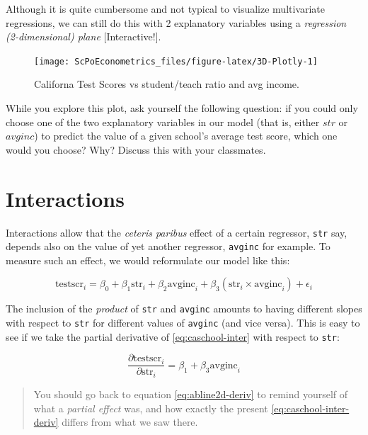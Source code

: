 \documentclass[]{book}
\theoremstyle{definition}
\theoremstyle{definition}
\theoremstyle{definition}
\theoremstyle{remark}
\begin{document}
Although it is quite cumbersome and not typical to visualize
multivariate regressions, we can still do this with 2 explanatory
variables using a \emph{regression (2-dimensional) plane}
{[}Interactive!{]}.

\begin{figure}

{\centering \texttt{[image: ScPoEconometrics\_files/figure-latex/3D-Plotly-1]} 

}

\caption{Californa Test Scores vs student/teach ratio and avg income.}\label{fig:3D-Plotly}
\end{figure}

While you explore this plot, ask yourself the following question: if you
could only choose one of the two explanatory variables in our model
(that is, either \(str\) or \(avginc\)) to predict the value of a given
school's average test score, which one would you choose? Why? Discuss
this with your classmates.

\section{Interactions}\label{mreg-interactions}

Interactions allow that the \emph{ceteris paribus} effect of a certain
regressor, \texttt{str} say, depends also on the value of yet another
regressor, \texttt{avginc} for example. To measure such an effect, we
would reformulate our model like this:

\[
\text{testscr}_i = \beta_0 + \beta_1  \text{str}_i + \beta_2  \text{avginc}_i + \beta_3 (\text{str}_i \times  \text{avginc}_i)+ \epsilon_i \label{eq:caschool-inter}
\]

The inclusion of the \emph{product} of \texttt{str} and \texttt{avginc}
amounts to having different slopes with respect to \texttt{str} for
different values of \texttt{avginc} (and vice versa). This is easy to
see if we take the partial derivative of \eqref{eq:caschool-inter} with
respect to \texttt{str}:

\[
\frac{\partial \text{testscr}_i}{\partial \text{str}_i} = \beta_1 + \beta_3 \text{avginc}_i \label{eq:caschool-inter-deriv}
\]

\begin{quote}
You should go back to equation \eqref{eq:abline2d-deriv} to remind
yourself of what a \emph{partial effect} was, and how exactly the
present \eqref{eq:caschool-inter-deriv} differs from what we saw there.
\end{quote}
\end{document}

